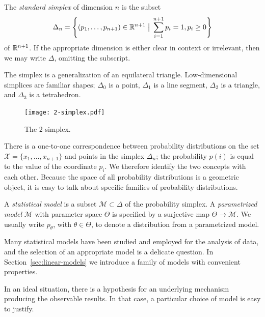 \documentclass[cclicense]{hmcthesis}
\providecommand*{\xs}{\mathcal X}
\providecommand*{\ms}{\mathcal M}
\newcommand*{\vbar}{\;\big\vert\;}
\numberwithin{equation}{chapter}
\numberwithin{thmcounter}{chapter}
\begin{document}
    \begin{definition} 
        The \emph{standard simplex} of dimension $n$ is the subset
        \[
            \Delta_n = 
            \left\{(p_1, \ldots, p_{n+1}) \in \R^{n+1} \vbar 
            \sum_{i=1}^{n+1} p_i= 1, p_i \ge 0 \right\} 
        \]
        of $\mathbb{R}^{n+1}$.  If the appropriate dimension is either clear in context
        or irrelevant, then we may write $\Delta$, omitting the subscript.
    \end{definition}

    The simplex is a generalization of an equilateral triangle.  Low-dimensional
    simplices are familiar shapes; $\Delta_0$ is a point, $\Delta_1$ is a line
    segment, $\Delta_2$ is a triangle, and $\Delta_3$ is a tetrahedron.

    \begin{figure}[H]
        \centering
        \texttt{[image: 2-simplex.pdf]}
        \caption{The 2-simplex.}
    \end{figure}

    There is a one-to-one correspondence between probability distributions on
    the set $\xs = \{x_1, \ldots, x_{n+1}\}$ and points in the simplex
    $\Delta_n$; the probability $p(i)$ is equal to the value of the coordinate
    $p_i$.  We therefore identify the two concepts with each other.
    Because the space of all probability distributions is a geometric
    object, it is easy to talk about specific families of probability
    distributions.

    \begin{definition}
    A \emph{statistical model} is a subset $\ms \subset \Delta$ of the
    probability simplex.  A \emph{parametrized model} $\ms$ with parameter space
    $\Theta$ is specified by a surjective map $\Theta \to \ms$.  We usually
    write $p_\theta$, with $\theta \in \Theta$, to denote a distribution from a
    parametrized model.
    \end{definition}

    Many statistical models have been studied and employed for the analysis of
    data, and the selection of an appropriate model is a delicate question.  In
    Section~\ref{sec:linear-models} we introduce a family of models with
    convenient properties.

    In an ideal situation, there is a hypothesis for an underlying mechanism
    producing the observable results.  In that case, a particular choice of
    model is easy to justify.
\end{document}
